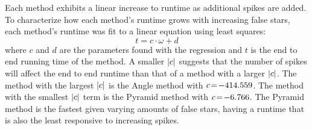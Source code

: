 %
%
%
Each method exhibits a linear increase to runtime as additional spikes are added.
To characterize how each method's runtime grows with increasing false stars, each method's runtime was fit to a linear
equation using least squares:
\begin{equation}
    t = c\cdot\omega + d
\end{equation}
where $c$ and $d$ are the parameters found with the regression and $t$ is the end to end running time of the method.
A smaller $\left| c \right|$ suggests that the number of spikes will affect the end to end runtime than that of a method with a
larger $\left| c \right|$.
The method with the largest $\left| c \right|$ is the Angle method with $c \!=\! -414.559$.
The method with the smallest $\left| c \right|$ term is the Pyramid method with $c \!=\! -6.766$.
The Pyramid method is the fastest given varying amounts of false stars, having a runtime that is also the least
responsive to increasing spikes.

